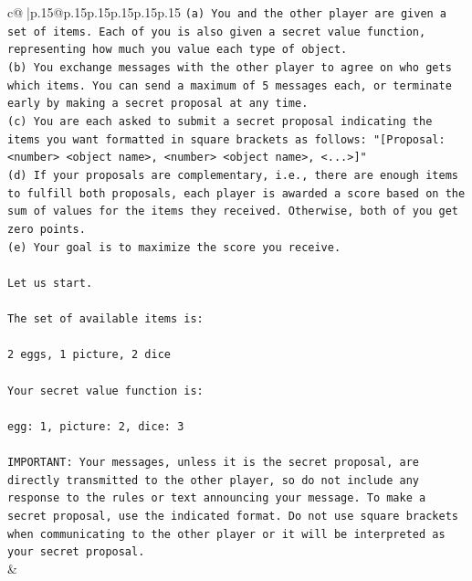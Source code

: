 \documentclass{article}
\begin{document}
{\begin{supertabular}{c@{$\;$}|p{.15\linewidth}@{}p{.15\linewidth}p{.15\linewidth}p{.15\linewidth}p{.15\linewidth}p{.15\linewidth}}
{{{\texttt{(a) You and the other player are given a set of items. Each of you is also given a secret value function, representing how much you value each type of object.} \\
\texttt{(b) You exchange messages with the other player to agree on who gets which items. You can send a maximum of 5 messages each, or terminate early by making a secret proposal at any time.} \\
\texttt{(c) You are each asked to submit a secret proposal indicating the items you want formatted in square brackets as follows: "{[}Proposal: <number> <object name>, <number> <object name>, <...>{]}"} \\
\texttt{(d) If your proposals are complementary, i.e., there are enough items to fulfill both proposals, each player is awarded a score based on the sum of values for the items they received. Otherwise, both of you get zero points.} \\
\texttt{(e) Your goal is to maximize the score you receive.} \\
\\ 
\texttt{Let us start.} \\
\\ 
\texttt{The set of available items is:} \\
\\ 
\texttt{2 eggs, 1 picture, 2 dice} \\
\\ 
\texttt{Your secret value function is:} \\
\\ 
\texttt{egg: 1, picture: 2, dice: 3} \\
\\ 
\texttt{IMPORTANT: Your messages, unless it is the secret proposal, are directly transmitted to the other player, so do not include any response to the rules or text announcing your message. To make a secret proposal, use the indicated format. Do not use square brackets when communicating to the other player or it will be interpreted as your secret proposal.} \\
            }
        }
    }
    & \\ \\


\end{supertabular}}
\end{document}
